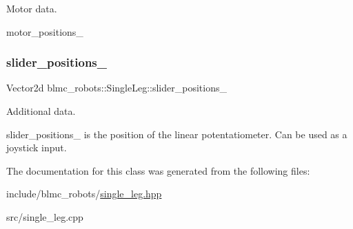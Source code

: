 Motor data. 

motor\+\_\+positions\+\_\+ \mbox{\label{classblmc__robots_1_1SingleLeg_af841dc84f18c70c85bb0e19dd88da85f}} 
\subsubsection{\texorpdfstring{slider\+\_\+positions\+\_\+}{slider\_positions\_}}
{\footnotesize\ttfamily Vector2d blmc\+\_\+robots\+::\+Single\+Leg\+::slider\+\_\+positions\+\_\+\hspace{0.3cm}{\ttfamily [private]}}



Additional data. 

slider\+\_\+positions\+\_\+ is the position of the linear potentatiometer. Can be used as a joystick input. 

The documentation for this class was generated from the following files\+:\begin{DoxyCompactItemize}
\item 
include/blmc\+\_\+robots/\hyperlink{single__leg_8hpp}{single\+\_\+leg.\+hpp}\item 
src/single\+\_\+leg.\+cpp\end{DoxyCompactItemize}
